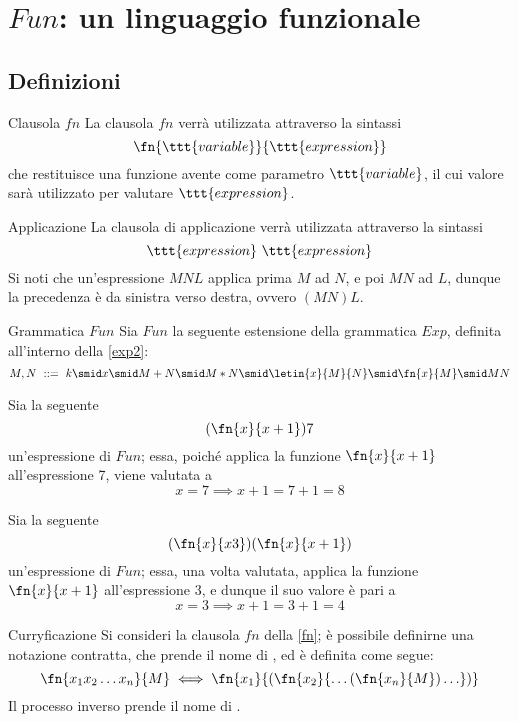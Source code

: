 \documentclass[a4paper, 12pt]{report}
\begin{document}
    \section{$Fun$: un linguaggio funzionale}

    \subsection{Definizioni}

    \begin{frameddefn}[label={fn}]{Clausola $fn$}
        La clausola $fn$ verrà utilizzata attraverso la sintassi $$\fn{\ttt{variable}}{\ttt{expression}}$$ che restituisce una funzione avente come parametro $\ttt{variable}$, il cui valore sarà utilizzato per valutare $\ttt{expression}$.
    \end{frameddefn}

    \begin{frameddefn}{Applicazione}
        La clausola di applicazione verrà utilizzata attraverso la sintassi $$\ttt{expression} \ \ttt{expression}$$ Si noti che un'espressione $MNL$ applica prima $M$ ad $N$, e poi $MN$ ad $L$, dunque la precedenza è da sinistra verso destra, ovvero $(MN)L$.
    \end{frameddefn}

    \begin{frameddefn}[label={fun}]{Grammatica $Fun$}
        Sia $Fun$ la seguente estensione della grammatica $Exp$, definita all'interno della \cref{exp2}: $$M,N \ ::= \ k \smid x \smid M + N \smid M * N \smid \letin{x}{M}{N} \smid \fn{x}{M} \smid MN$$
    \end{frameddefn}

    \begin{example}
        Sia la seguente $$(\fn{x}{x +1})7$$ un'espressione di $Fun$; essa, poiché applica la funzione $\fn{x}{x+1}$ all'espressione 7, viene valutata a $$x = 7 \implies x + 1= 7 + 1 = 8$$
    \end{example}

    \begin{example}
        \label{expr fun}
        Sia la seguente $$(\fn{x}{x3})(\fn{x}{x+1})$$ un'espressione di $Fun$; essa, una volta valutata, applica la funzione $\fn{x}{x+1}$ all'espressione 3, e dunque il suo valore è pari a $$x = 3 \implies x + 1 = 3 + 1 = 4$$
    \end{example}

    \begin{frameddefn}{Curryficazione}
        Si consideri la clausola $fn$ della \cref{fn}; è possibile definirne una notazione contratta, che prende il nome di , ed è definita come segue: $$\fn{x_1x_2 \ldots x_n}{M} \iff \fn{x_1}{(\fn{x_2}{\ldots (\fn{x_n}{M}) \ldots})}$$ Il processo inverso prende il nome di .
    \end{frameddefn}
\end{document}
